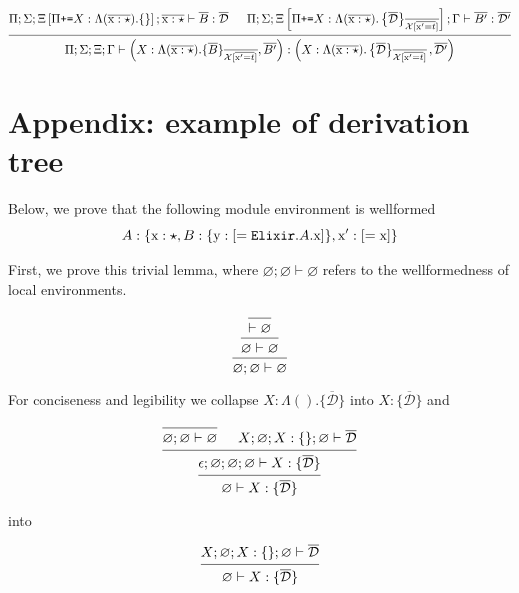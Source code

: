 \documentclass[12pt]{article}
\newcommand{\tx}{\text{\rm x}}
\newcommand{\ty}{\text{\rm y}}
\newcommand{\BX}{\ensuremath{\mathcal{X}}}
\newcommand{\emptyenv}{\varnothing}
\newcommand{\Gammatop}{\ensuremath{\Xi}}
\newcommand{\Gammabot}{\ensuremath{\Gamma}}
\newcommand{\Elixir}{\texttt{Elixir}}
\begin{document}
\[
    \begin{prooftree}
        \hypo{ \Pi; \Sigma; \Gammatop\left[\Pi \texttt{+=} X : \Lambda (\overline{\tx : \star}). \{\}\right]; \overline{\tx : \star} \vdash \overline{B} : \overline{\mathcal{D}} }
        \hypo{ \Pi; \Sigma; \Gammatop\left[\Pi \texttt{+=} X : \Moddecl\right]; \Gammabot \vdash \overline{B'} : \overline{\mathcal{D}'} }
        \infer2{ \Pi; \Sigma; \Gammatop; \Gammabot \vdash \left(X : \Lambda (\overline{\tx : \star}). \{\overline{B}\}_{\overline{\BX[\overline{\tx'  = t}]}}, \overline{B'}\right) : \left(X : \Moddecl, \overline{\mathcal{D}'}\right) }
    \end{prooftree}
\]

\section{Appendix: example of derivation tree}

Below, we prove that the following module environment is wellformed
$$A : \{ \tx : \star, B : \{ \ty : [= \Elixir.A.\tx] \}, \tx' : [= \tx] \}$$

First, we prove this trivial lemma, where $\emptyenv; \emptyenv \vdash \emptyenv$
refers to the wellformedness of local environments.

\[
    \begin{prooftree}
        \infer0{  \vdash \emptyenv }
        \infer1{ \emptyenv \vdash \emptyenv }
        \infer1{ \emptyenv; \emptyenv \vdash \emptyenv }
    \end{prooftree}
\]

For conciseness and legibility we collapse $X : \Lambda (). \{ \overline{\mathcal{D}} \}$ into
$X : \{ \overline{\mathcal{D}} \}$ and

\[
    \begin{prooftree}
        \infer0{ \emptyenv; \emptyenv \vdash \emptyenv }
        \hypo{ X; \emptyenv; X : \{\}; \emptyenv \vdash \overline{\mathcal{D}} }
        \infer2{ \epsilon; \emptyenv; \emptyenv; \emptyenv \vdash X : \{ \overline{\mathcal{D}} \} }
        \infer1{ \emptyenv \vdash X : \{ \overline{\mathcal{D}} \}}
    \end{prooftree}
\]

into

\[
    \begin{prooftree}
        \hypo{ X; \emptyenv; X : \{\}; \emptyenv \vdash \overline{\mathcal{D}} }
        \infer1{ \emptyenv \vdash X : \{ \overline{\mathcal{D}} \}}
    \end{prooftree}
\]
\end{document}
